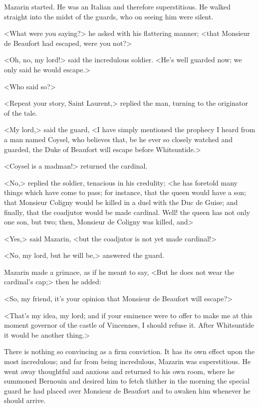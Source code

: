 Mazarin started. He was an Italian and therefore superstitious. He walked straight into the midst of the guards, who on seeing him were silent.

<What were you saying?> he asked with his flattering manner; <that Monsieur de Beaufort had escaped, were you not?>

<Oh, no, my lord!> said the incredulous soldier. <He's well guarded now; we only said he would escape.>

<Who said so?>

<Repeat your story, Saint Laurent,> replied the man, turning to the originator of the tale.

<My lord,> said the guard, <I have simply mentioned the prophecy I heard from a man named Coysel, who believes that, be he ever so closely watched and guarded, the Duke of Beaufort will escape before Whitsuntide.>

<Coysel is a madman!> returned the cardinal.

<No,> replied the soldier, tenacious in his credulity; <he has foretold many things which have come to pass; for instance, that the queen would have a son; that Monsieur Coligny would be killed in a duel with the Duc de Guise; and finally, that the coadjutor would be made cardinal. Well! the queen has not only one son, but two; then, Monsieur de Coligny was killed, and\longdash>

<Yes,> said Mazarin, <but the coadjutor is not yet made cardinal!>

<No, my lord, but he will be,> answered the guard.

Mazarin made a grimace, as if he meant to say, <But he does not wear the cardinal's cap;> then he added:

<So, my friend, it's your opinion that Monsieur de Beaufort will escape?>

<That's my idea, my lord; and if your eminence were to offer to make me at this moment governor of the castle of Vincennes, I should refuse it. After Whitsuntide it would be another thing.>

There is nothing so convincing as a firm conviction. It has its own effect upon the most incredulous; and far from being incredulous, Mazarin was superstitious. He went away thoughtful and anxious and returned to his own room, where he summoned Bernouin and desired him to fetch thither in the morning the special guard he had placed over Monsieur de Beaufort and to awaken him whenever he should arrive.

